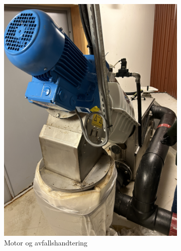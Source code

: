 \begin{figure}[htbp]
    \centering
    \begin{subfigure}[b]{0.3\textwidth}
        \centering
        \includegraphics[angle=-90,width=1\textwidth]{Bilder/Huber.JPG}
        \caption{Motor og avfallshandtering}\label{fig:subfig1}
    \end{subfigure}
    \hfill
    \begin{subfigure}[b]{0.3\textwidth}
        \centering

\end{subfigure}
\end{figure}
